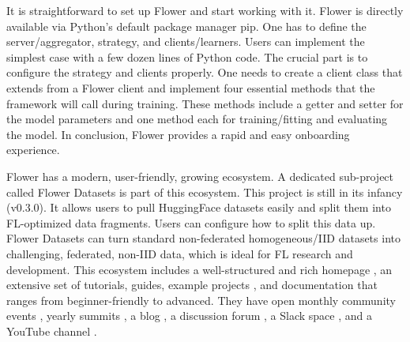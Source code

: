 It is straightforward to set up Flower and start working with it.
Flower is directly available via Python's default package manager pip.
One has to define the server/aggregator, strategy, and clients/learners.
Users can implement the simplest case with a few dozen lines of Python code.
The crucial part is to configure the strategy and clients properly.
One needs to create a client class that extends from a Flower client and implement four essential methods that the framework will call during training.
These methods include a getter and setter for the model parameters and one method each for training/fitting and evaluating the model.
In conclusion, Flower provides a rapid and easy onboarding experience.

Flower has a modern, user-friendly, growing ecosystem.
A dedicated sub-project called Flower Datasets \cite{flower:datasets} is part of this ecosystem.
This project is still in its infancy (v0.3.0).
It allows users to pull HuggingFace \cite{hugging_face_homepage} datasets easily and split them into FL-optimized data fragments.
Users can configure how to split this data up.
Flower Datasets can turn standard non-federated homogeneous/IID datasets into challenging, federated, non-IID data, which is ideal for FL research and development.
This ecosystem includes a well-structured and rich homepage \cite{flower:homepage}, an extensive set of tutorials, guides, example projects \cite{flower:examples}, and documentation \cite{flower:homepage_docs, flower_docs} that ranges from beginner-friendly to advanced.
They have open monthly community events \cite{flower:monthly}, yearly summits \cite{flower:summit}, a blog \cite{flower:blog}, a discussion forum \cite{flower:forum}, a Slack space \cite{flower:slack}, and a YouTube channel \cite{flower:youtube}.